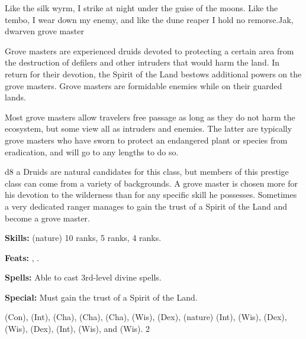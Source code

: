 {Like the silk wyrm, I strike at night under the guise of the moons. Like the tembo, I wear down my enemy, and like the dune reaper I hold no remorse.}{Jak, dwarven grove master}
{Grove masters are experienced druids devoted to protecting a certain area from the destruction of defilers and other intruders that would harm the land. In return for their devotion, the Spirit of the Land bestows additional powers on the grove masters. Grove masters are formidable enemies while on their guarded lands.

Most grove masters allow travelers free passage as long as they do not harm the ecosystem, but some view all as intruders and enemies. The latter are typically grove masters who have sworn to protect an endangered plant or species from eradication, and will go to any lengths to do so.}
{d8}
{a}
{Druids are natural candidates for this class, but members of this prestige class can come from a variety of backgrounds. A grove master is chosen more for his devotion to the wilderness than for any specific skill he possesses. Sometimes a very dedicated ranger manages to gain the trust of a Spirit of the Land and become a grove master.}
{
\textbf{Skills:}  (nature) 10 ranks,  5 ranks,  4 ranks.

\textbf{Feats:} , .

\textbf{Spells:} Able to cast 3rd-level divine spells.

\textbf{Special:} Must gain the trust of a Spirit of the Land.
}
{ (Con),  (Int),  (Cha),  (Cha),  (Cha),  (Wis),  (Dex),  (nature) (Int),  (Wis),  (Dex),  (Wis),  (Dex),  (Int),  (Wis), and  (Wis).
}
{2}
